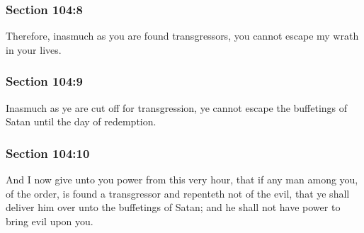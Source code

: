 	\subsubsection{Section 104:8} %
		\label{DC104-8}

		Therefore, inasmuch as you are found transgressors, you cannot escape my wrath in your lives.


	\subsubsection{Section 104:9} %
		\label{DC104-9}

		Inasmuch as ye are cut off for transgression, ye cannot escape the buffetings of Satan until the day of redemption.


	\subsubsection{Section 104:10} %
		\label{DC104-10}

		And I now give unto you power from this very hour, that if any man among you, of the order, is found a transgressor and repenteth not of the evil, that ye shall deliver him over unto the buffetings of Satan; and he shall not have power to bring evil upon you.


